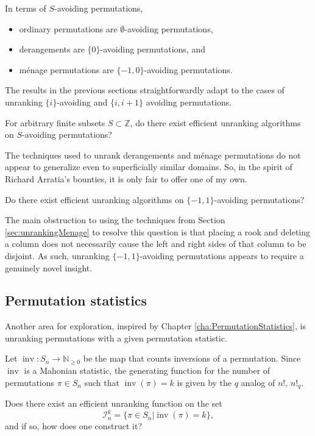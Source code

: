 \begin{example}
  In terms of $S$-avoiding permutations, \begin{itemize}
    \item ordinary permutations are $\emptyset$-avoiding permutations,
    \item derangements are $\{0\}$-avoiding permutations, and
    \item m\'enage permutations are $\{-1,0\}$-avoiding permutations.
  \end{itemize}
\end{example}

The results in the previous sections straightforwardly adapt to the cases of
unranking $\{i\}$-avoiding and $\{i, i+1\}$ avoiding permutations.

\begin{openquestion}
  For arbitrary finite subsets $S \subset \mathbb Z$,
  do there exist efficient unranking algorithms on $S$-avoiding permutations?
\end{openquestion}

The techniques used to unrank derangements and m\'enage permutations do
not appear to generalize even to superficially similar domains. So, in the
spirit of Richard Arratia's bounties, it is only fair to offer one of my own.

\begin{problem}
  Do there exist efficient unranking algorithms on $\{-1, 1\}$-avoiding
  permutations?
\end{problem}

The main obstruction to using the techniques from
Section \ref{sec:unrankingMenage} to resolve this question is that placing
a rook and deleting a column does not necessarily cause the left and right
sides of that column to be disjoint. As such, unranking $\{-1,1\}$-avoiding
permutations appears to require a genuinely novel insight.

\subsection{Permutation statistics}
Another area for exploration, inspired by Chapter \ref{cha:PermutationStatistics},
is unranking permutations with a given permutation statistic.

\begin{openquestion}
  Let $\operatorname{inv}\colon S_n \rightarrow \mathbb N_{\geq 0}$ be the map
  that counts inversions of a permutation. Since $\operatorname{inv}$ is a
  Mahonian statistic, the generating function for the number of permutations
  $\pi \in S_n$ such that $\operatorname{inv}(\pi) = k$ is given by the
  $q$ analog of $n!$, $n!_q$.

  Does there exist an efficient unranking function on the set \begin{equation}
    \mathcal{I}_n^k = \{\pi \in S_n | \operatorname{inv}(\pi) = k\},
  \end{equation} and if so, how does one construct it?
\end{openquestion}

